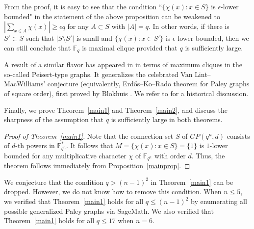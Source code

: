 \documentclass[Unicode,ALCO,published]{cedram}
\newcommand{\F}{\mathbb{F}}
\begin{document}
\begin{rema}\rm
From the proof, it is easy to see that the condition ``$\{\chi(x): x \in S\}$ is $\epsilon$-lower bounded" in the statement of the above proposition can be weakened to $|\sum_{x \in A} \chi(x)| \geq \epsilon q$
for any $A \subset S$ with $|A|=q$. In other words, if there is $S' \subset S$ such that $|S \setminus S'|$ is small and $\{\chi(x): x \in S'\}$ is $\epsilon$-lower bounded, then we can still conclude that $\F_q$ is maximal clique provided that $q$ is sufficiently large.
\end{rema}

\begin{rema}\rm
A result of a similar flavor has appeared in \cite[Theorem 1.3]{AY} in terms of maximum cliques in the so-called Peisert-type graphs. It generalizes the celebrated Van Lint--MacWilliams' conjecture (equivalently, Erd\H{o}s--{K}o--{R}ado theorem for Paley graphs of square order), first proved by Blokhuis \cite{Blo84}. We refer to \cite[Section 2]{AY} for a historical discussion.
\end{rema}

Finally, we prove Theorem~\ref{main1} and Theorem~\ref{main2}, and discuss the sharpness of the assumption that $q$ is sufficiently large in both theorems.

\begin{proof}[Proof of Theorem~\ref{main1}]
Note that the connection set $S$ of $GP(q^n,d)$ consists of $d$-th powers in $\F_{q^n}^*$. It follows that $M=\{\chi(x): x \in S\}=\{1\}$ is $1$-lower bounded for any multiplicative character $\chi$ of $\F_{q^n}$ with order $d$. Thus, the theorem follows immediately from Proposition~\ref{mainprop}.
\end{proof}

\begin{rema}\rm
We conjecture that the condition $q>(n-1)^2$ in Theorem~\ref{main1} can be dropped. However, we do not know how to remove this condition. When $n \leq 5$, we verified that Theorem~\ref{main1} holds for all $q \leq (n-1)^2$ by enumerating all possible generalized Paley graphs via SageMath. We also verified that Theorem~\ref{main1} holds for all $q \leq 17$ when $n=6$. 
\end{rema}
\end{document}
